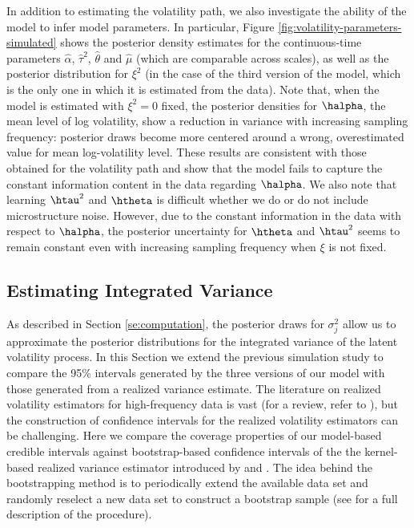 In addition to estimating the volatility path, we also investigate the ability of the model to infer model parameters.  In particular, Figure \ref{fig:volatility-parameters-simulated} shows the posterior density estimates for the continuous-time parameters $\hat{\alpha}$, $\hat{\tau}^2$, $\hat{\theta}$ and $\hat{\mu}$ (which are comparable across scales), as well as the posterior distribution for $\xi^2$ (in the case of the third version of the model, which is the only one in which it is estimated from the data).  Note that, when the model is estimated with $\xi^2 = 0$ fixed, the posterior densities for $\halpha$, the mean level of log volatility, show a reduction in variance with increasing sampling frequency:  posterior draws become more centered around a wrong, overestimated value for mean log-volatility level. These results are consistent with those obtained for the volatility path and show that the model fails to capture the constant information content in the data regarding $\halpha$.  We also note that learning $\htau^2$ and $\htheta$ is difficult whether we do or do not include microstructure noise. However, due to the constant information in the data with respect to $\halpha$, the posterior uncertainty for $\htheta$ and $\htau^2$ seems to remain constant even with increasing sampling frequency when $\xi$ is not fixed.

\subsection{Estimating Integrated Variance}

As described in Section \ref{se:computation}, the posterior draws for $\sigma^2_{j}$ allow us to approximate the posterior distributions for the integrated variance of the latent volatility process. In this Section we extend the previous simulation study to compare the 95\% intervals generated by the three versions of our model with those generated from a realized variance estimate.  The literature on realized volatility estimators for high-frequency data is vast (for a review, refer to \cite{pigorsch2012volatility}), but the construction of confidence intervals for the realized volatility estimators can be challenging.  Here we compare the coverage properties of our model-based credible intervals against bootstrap-based confidence intervals of the the kernel-based realized variance estimator introduced by \cite{zhou1996high} and \cite{hansen2006realized}. The idea behind the bootstrapping method is to periodically extend the available data set and randomly reselect a new data set to construct a bootstrap sample (see \cite{hwang2013stationary-bootstrap} for a full description of the procedure).

